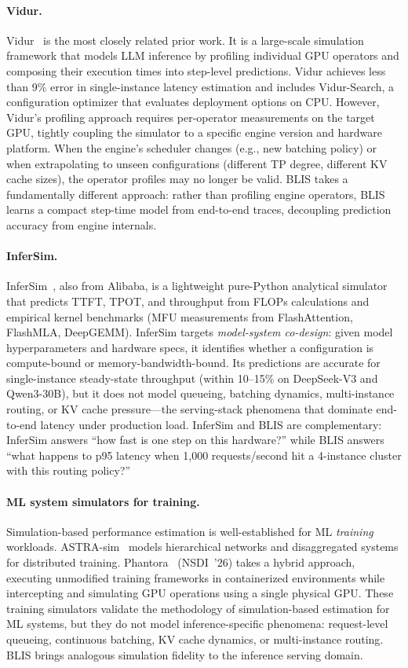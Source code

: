 \documentclass[11pt]{article}
\theoremstyle{plain} %
\theoremstyle{definition} %
\theoremstyle{remark} %
\numberwithin{equation}{section}
\begin{document}
\paragraph{Vidur.}
Vidur~\cite{agrawal2024vidur} is the most closely related prior work.
It is a large-scale simulation framework that models LLM inference by profiling individual GPU operators and composing their execution times into step-level predictions.
Vidur achieves less than 9\% error in single-instance latency estimation and includes Vidur-Search, a configuration optimizer that evaluates deployment options on CPU.
However, Vidur's profiling approach requires per-operator measurements on the target GPU, tightly coupling the simulator to a specific engine version and hardware platform.
When the engine's scheduler changes (e.g., new batching policy) or when extrapolating to unseen configurations (different TP degree, different KV cache sizes), the operator profiles may no longer be valid.
BLIS takes a fundamentally different approach: rather than profiling engine operators, BLIS learns a compact step-time model from end-to-end traces, decoupling prediction accuracy from engine internals.

\paragraph{InferSim.}
InferSim~\cite{alibaba2025infersim}, also from Alibaba, is a lightweight pure-Python analytical simulator that predicts TTFT, TPOT, and throughput from FLOPs calculations and empirical kernel benchmarks (MFU measurements from FlashAttention, FlashMLA, DeepGEMM).
InferSim targets \emph{model-system co-design}: given model hyperparameters and hardware specs, it identifies whether a configuration is compute-bound or memory-bandwidth-bound.
Its predictions are accurate for single-instance steady-state throughput (within 10--15\% on DeepSeek-V3 and Qwen3-30B), but it does not model queueing, batching dynamics, multi-instance routing, or KV cache pressure---the serving-stack phenomena that dominate end-to-end latency under production load.
InferSim and BLIS are complementary: InferSim answers ``how fast is one step on this hardware?'' while BLIS answers ``what happens to p95 latency when 1{,}000 requests/second hit a 4-instance cluster with this routing policy?''

\paragraph{ML system simulators for training.}
Simulation-based performance estimation is well-established for ML \emph{training} workloads.
ASTRA-sim~\cite{won2023astrasim2} models hierarchical networks and disaggregated systems for distributed training.
Phantora~\cite{qin2025phantora} (NSDI~'26) takes a hybrid approach, executing unmodified training frameworks in containerized environments while intercepting and simulating GPU operations using a single physical GPU.
These training simulators validate the methodology of simulation-based estimation for ML systems, but they do not model inference-specific phenomena: request-level queueing, continuous batching, KV cache dynamics, or multi-instance routing.
BLIS brings analogous simulation fidelity to the inference serving domain.
\end{document}
